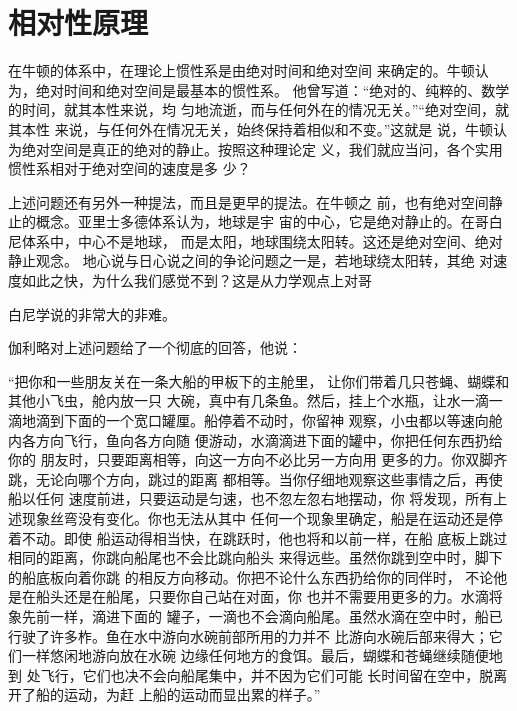 \section{相对性原理}\label{sec:11.02}

在牛顿的体系中，在理论上惯性系是由绝对时间和绝对空间
来确定的。牛顿认为，绝对时间和绝对空间是最基本的惯性系。
他曾写道：“绝对的、纯粹的、数学的时间，就其本性来说，均
匀地流逝，而与任何外在的情况无关。”“绝对空间，就其本性
来说，与任何外在情况无关，始终保持着相似和不变。”这就是
说，牛顿认为绝对空间是真正的绝对的静止。按照这种理论定
义，我们就应当问，各个实用惯性系相对于绝对空间的速度是多
少？

上述问题还有另外一种提法，而且是更早的提法。在牛顿之
前，也有绝对空间静止的概念。亚里士多德体系认为，地球是宇
宙的中心，它是绝对静止的。在哥白尼体系中，中心不是地球，
而是太阳，地球围绕太阳转。这还是绝对空间、绝对静止观念。
地心说与日心说之间的争论问题之一是，若地球绕太阳转，其绝
对速度如此之快，为什么我们感觉不到？这是从力学观点上对哥

\clearpage\noindent
白尼学说的非常大的非难。

伽利略对上述问题给了一个彻底的回答，他说：

\begin{quoting}
    “把你和一些朋友关在一条大船的甲板下的主舱里，
让你们带着几只苍蝇、蝴蝶和其他小飞虫，舱内放一只
大碗，真中有几条鱼。然后，挂上个水瓶，让水一滴一
滴地滴到下面的一个宽口罐厘。船停着不动时，你留神
观察，小虫都以等速向舱内各方向飞行，鱼向各方向随
便游动，水滴滴进下面的罐中，你把任何东西扔给你的
朋友时，只要距离相等，向这一方向不必比另一方向用
更多的力。你双脚齐跳，无论向哪个方向，跳过的距离
都相等。当你仔细地观察这些事情之后，再使船以任何
速度前进，只要运动是匀速，也不忽左忽右地摆动，你
将发现，所有上述现象丝弯没有变化。你也无法从其中
任何一个现象里确定，船是在运动还是停着不动。即使
船运动得相当快，在跳跃时，他也将和以前一样，在船
底板上跳过相同的距离，你跳向船尾也不会比跳向船头
来得远些。虽然你跳到空中时，脚下的船底板向着你跳
的相反方向移动。你把不论什么东西扔给你的同伴时，
不论他是在船头还是在船尾，只要你自己站在对面，你
也并不需要用更多的力。水滴将象先前一样，滴进下面的
罐子，一滴也不会滴向船尾。虽然水滴在空中时，船已
行驶了许多柞。鱼在水中游向水碗前部所用的力并不
比游向水碗后部来得大；它们一样悠闲地游向放在水碗
边缘任何地方的食饵。最后，蝴蝶和苍蝇继续随便地到
处飞行，它们也决不会向船尾集中，并不因为它们可能
长时间留在空中，脱离开了船的运动，为赶
\clearpage\noindent
上船的运动而显出累的样子。”
\end{quoting}

